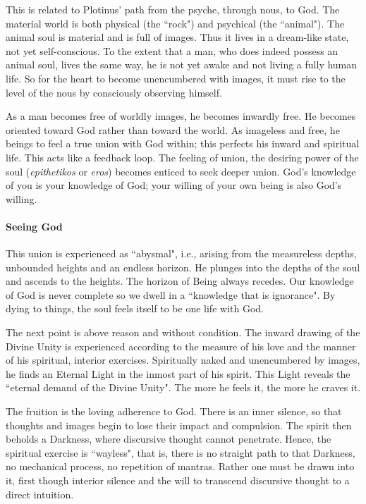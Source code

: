 This is related to Plotinus' path from the psyche, through nous, to God. The material world is both physical (the ``rock") and psychical (the ``animal"). The animal soul is material and is full of images. Thus it lives in a dream-like state, not yet self-conscious. To the extent that a man, who does indeed possess an animal soul, lives the same way, he is not yet awake and not living a fully human life. So for the heart to become unencumbered with images, it must rise to the level of the nous by consciously observing himself.

As a man becomes free of worldly images, he becomes inwardly free. He becomes oriented toward God rather than toward the world. As imageless and free, he beings to feel a true union with God within; this perfects his inward and spiritual life. This acts like a feedback loop. The feeling of union, the desiring power of the soul (\emph{epithetikos} or \emph{eros}) becomes enticed to seek deeper union. God's knowledge of you is your knowledge of God; your willing of your own being is also God's willing.

\paragraph{Seeing God}
This union is experienced as ``abysmal", i.e., arising from the measureless depths, unbounded heights and an endless horizon. He plunges into the depths of the soul and ascends to the heights. The horizon of Being always recedes. Our knowledge of God is never complete so we dwell in a ``knowledge that is ignorance". By dying to things, the soul feels itself to be one life with God.

The next point is above reason and without condition. The inward drawing of the Divine Unity is experienced according to the measure of his love and the manner of his spiritual, interior exercises. Spiritually naked and unencumbered by images, he finds an Eternal Light in the inmost part of his spirit. This Light reveals the ``eternal demand of the Divine Unity". The more he feels it, the more he craves it.

The fruition is the loving adherence to God. There is an inner silence, so that thoughts and images begin to lose their impact and compulsion. The spirit then beholds a Darkness, where discursive thought cannot penetrate. Hence, the spiritual exercise is ``wayless", that is, there is no straight path to that Darkness, no mechanical process, no repetition of mantras. Rather one must be drawn into it, first though interior silence and the will to transcend discursive thought to a direct intuition.




